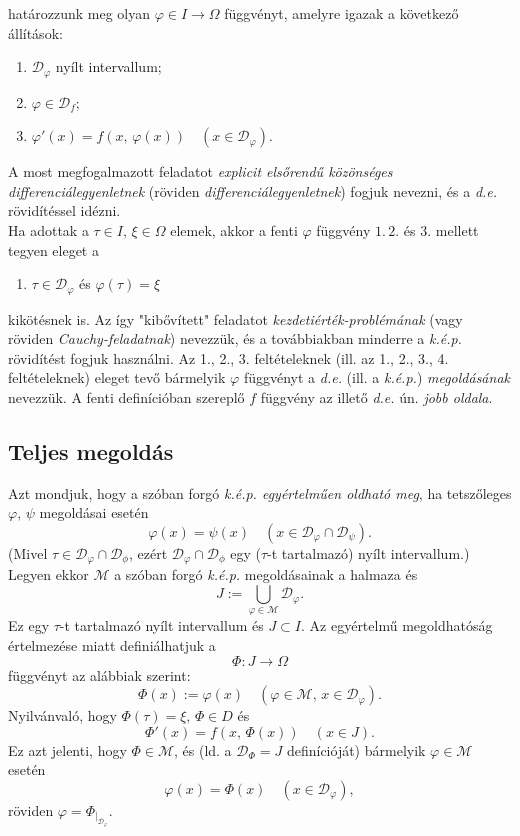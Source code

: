 \documentclass[12pt]{article}
\newcommand{\D}{\mathcal{D}_f}
\newcommand{\Dp}{\mathcal{D}_\varphi}
\begin{document}
    határozzunk meg olyan $\varphi \in I \to \Omega$ függvényt, amelyre igazak a következő állítások:
    \begin{enumerate}
        \item $\Dp$ nyílt intervallum;
        \item $\varphi \in \D$;
        \item $\varphi'(x) = f(x, \, \varphi(x)) \quad (x \in \Dp)$.
    \end{enumerate}
    A most megfogalmazott feladatot \textit{explicit elsőrendű közönséges differenciálegyenletnek} (röviden \textit{differenciálegyenletnek}) fogjuk nevezni, és a \textit{d.e.} rövidítéssel idézni.\\

    Ha adottak a $\tau \in I, \, \xi \in \Omega$ elemek, akkor a fenti $\varphi$ függvény $1. \, 2.$ és 3. mellett tegyen eleget a
    \begin{enumerate}[start=4]
        \item $\tau \in \Dp$ és $\varphi(\tau) = \xi$
    \end{enumerate}
    kikötésnek is. Az így "kibővített" feladatot \textit{kezdetiérték-problémának} (vagy röviden \textit{Cauchy-feladatnak}) nevezzük, és a továbbiakban minderre a \textit{k.é.p.} rövidítést fogjuk használni. Az 1., 2., 3. feltételeknek (ill. az 1., 2., 3., 4. feltételeknek) eleget tevő bármelyik $\varphi$ függvényt a \textit{d.e.} (ill. a \textit{k.é.p.}) \textit{megoldásának} nevezzük. A fenti definícióban szereplő $f$ függvény az illető \textit{d.e.} ún. \textit{jobb oldala}.

    \subsection{Teljes megoldás}
    Azt mondjuk, hogy a szóban forgó \textit{k.é.p. egyértelműen oldható meg}, ha tetszőleges $\varphi, \, \psi$ megoldásai esetén
    \[
        \varphi(x) = \psi(x) \quad (x \in \Dp \cap \mathcal{D}_\psi).
    \]
    (Mivel $\tau \in \Dp \cap \mathcal{D}_\phi$, ezért $\Dp \cap \mathcal{D}_\phi$ egy ($\tau$-t tartalmazó) nyílt intervallum.) Legyen ekkor $\mathcal{M}$ a szóban forgó \textit{k.é.p.} megoldásainak a halmaza és
    \[
        J := \bigcup_{\varphi \in \mathcal{M}} \Dp.
    \]
    Ez egy $\tau$-t tartalmazó nyílt intervallum és $J \subset I$. Az egyértelmű megoldhatóság értelmezése miatt definiálhatjuk a
    \[
        \Phi : J \to \Omega
    \]
    függvényt az alábbiak szerint:
    \[
        \Phi(x) := \varphi(x) \quad (\varphi \in \mathcal{M}, \, x \in \Dp).
    \]
    Nyilvánvaló, hogy $\Phi(\tau) = \xi, \, \Phi \in D$ és
    \[
        \Phi'(x) = f(x, \, \Phi(x)) \quad (x \in J).
    \]
    Ez azt jelenti, hogy $\Phi \in \mathcal{M}$, és (ld. a $\mathcal{D}_\Phi = J$ definícióját) bármelyik $\varphi \in \mathcal{M}$ esetén
    \[
        \varphi(x) = \Phi(x) \quad (x \in \Dp),
    \]
    röviden $\varphi = \Phi_{|_{\Dp}}$.\\
\end{document}
